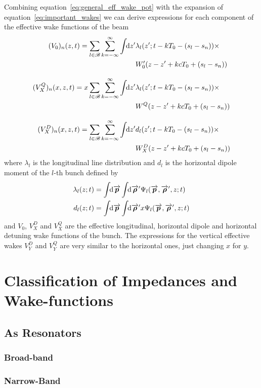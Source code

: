 \documentclass[
	12pt,				%
	openright,			%
	oneside,			%
	a4paper,		%
	chapter=TITLE,		%
	section=TITLE,		%
    brazil,				%
	english,			%
	sumario=tradicional,
	]{abntex2}
\begin{document}
  Combining equation~\eqref{eq:general_eff_wake_pot} with the expansion of equation~\eqref{eq:important_wakes} we can derive expressions for each component of the effective wake functions of the beam
  \begin{align}
	  (V_0)_n(z, t) =\nonumber \sum_{l\in\mathscr{B}}\sum_{k=-\infty}^\infty\int\!\!\text{d}z' 
	  			&\lambda_l(z'; t-kT_0-(s_l-s_n))
				\times\\
				&W'_0(z-z' + kcT_0 + (s_l-s_n))\\[3mm]
	  (V^Q_X)_n(x, z, t) =\nonumber x\sum_{l\in\mathscr{B}}\sum_{k=-\infty}^\infty\int\!\!\text{d}z' 
	  			&\lambda_l(z'; t-kT_0-(s_l-s_n))
				\times\\
				&W^Q(z-z' + kcT_0 + (s_l-s_n))\\[3mm]
	  (V^D_X)_n(x, z, t) =\nonumber \sum_{l\in\mathscr{B}}\sum_{k=-\infty}^\infty\int\!\!\text{d}z' 
	  			&d_l(z'; t-kT_0-(s_l-s_n))
				\times\\
				&W^D_X(z-z' + kcT_0 + (s_l-s_n))
  \end{align}
  where $\lambda_l$ is the longitudinal line distribution and $d_l$ is the horizontal dipole moment of the $l$-th bunch defined by
  \begin{align}
	  \lambda_l(z; t) = \udefint{\vect{p}}{\udefint{\vect{\rho}'}{
	  			&\Psi_l(\vect{p},\vect{\rho}',z; t)}}\\
	  d_l(z; t) = \udefint{\vect{p}}{\udefint{\vect{\rho}'}{
	  			&x\Psi_l(\vect{p},\vect{\rho}',z; t)}}\\
  \end{align}
  and $V_0$, $V^D_X$ and $V^Q_X$ are the effective longitudinal, horizontal dipole and horizontal detuning wake functions of the bunch. The expressions for the vertical effective wakes $V^D_Y$ and $V^Q_Y$ are very similar to the horizontal ones, just changing $x$ for $y$.



  \section{Classification of Impedances and Wake-functions}
    \subsection{As Resonators}
      \subsubsection{Broad-band}
      \subsubsection{Narrow-Band}
\end{document}

